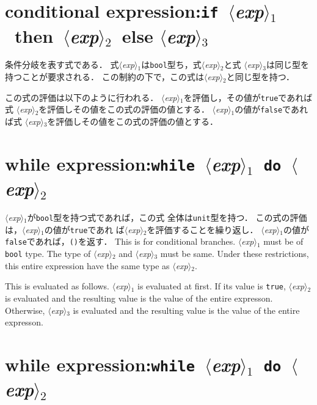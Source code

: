 \documentclass{jbook}
\newcommand{\txt}[2]{#2}
\newcommand{\code}[1]{\mbox{\large\tt #1}}
\newcommand{\nonterm}[1]{\mbox{$\langle$}{\it #1}\mbox{$\rangle$}}
\newcommand{\term}[1]{\mbox{{\tt #1}}}
\begin{document}
\section{\txt{条件式}{conditional expression}:\term{if}\ \nonterm{exp}$_1$\ then\ \nonterm{exp}$_2$\
else \nonterm{exp}$_3$}

\ifjp%
	条件分岐を表す式である．
	式\nonterm{exp}$_1$は\code{bool}型ち，式\nonterm{exp}$_2$と式
\nonterm{exp}$_3$は同じ型を持つことが要求される．
	この制約の下で，この式は\nonterm{exp}$_2$と同じ型を持つ．
	
	この式の評価は以下のように行われる．
	\nonterm{exp}$_1$を評価し，その値が\code{true}であれば式
\nonterm{exp}$_2$を評価しその値をこの式の評価の値とする．
	\nonterm{exp}$_1$の値が\code{false}であれば式
\nonterm{exp}$_3$を評価しその値をこの式の評価の値とする．

\section{\txt{while式}{while expression}:\term{while}\ \nonterm{exp}$_1$\ \term{do}\ \nonterm{exp}$_2$}

	\nonterm{exp}$_1$が\code{bool}型を持つ式であれば，この式
全体は\code{unit}型を持つ．
	この式の評価は，\nonterm{exp}$_1$の値が\code{true}であれ
ば\nonterm{exp}$_2$を評価することを繰り返し．
	\nonterm{exp}$_1$の値が\code{false}であれば，\code{()}を返す．
\else%
	This is for conditional branches.
	\nonterm{exp}$_1$ must be of \code{bool} type.
	The type of \nonterm{exp}$_2$ and \nonterm{exp}$_3$ must be
same.
	Under these restrictions,
this entire expression have the same type as \nonterm{exp}$_2$.

	This is evaluated as follows.
	\nonterm{exp}$_1$ is evaluated at first.
	If its value is \code{true},
\nonterm{exp}$_2$ is evaluated and the resulting value is the value
of the entire expresson.
	Otherwise,
\nonterm{exp}$_3$ is evaluated and the resulting value is the value
of the entire expresson.
\fi%

\section{\txt{while式}{while expression}:\term{while}\ \nonterm{exp}$_1$\ \term{do}\ \nonterm{exp}$_2$}
\end{document}
